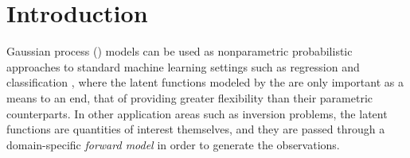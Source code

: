 \section{Introduction}
% 

  
 Gaussian process (\gp) models can be used as nonparametric probabilistic approaches
 to standard machine learning settings such as regression and classification
\cite{rasmussen-williams-book}, where the latent functions modeled by the \gp 
are only important as a means to an end, that of providing 
greater flexibility than their parametric counterparts.
In other application areas such as inversion problems, the latent
functions are quantities of interest themselves,  and they  are passed through
a domain-specific \emph{forward model} in order to generate the observations.



